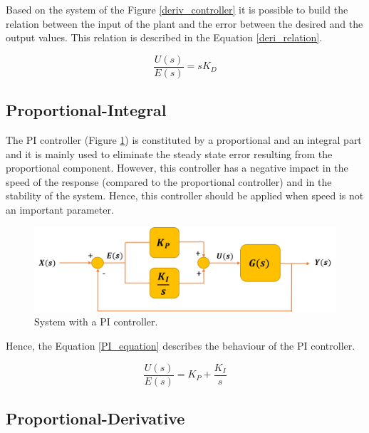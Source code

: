 Based on the system of the Figure \ref{deriv_controller} it is possible to build the relation between the input of the plant and the error between the desired and the output values. This relation is described in the Equation \ref{deri_relation}.

\begin{equation}\label{deri_relation}
\frac{U(s)}{E(s)}= sK_D
\end{equation}

\subsection*{Proportional-Integral}

The PI controller (Figure \ref{PI_controller}) is constituted by a proportional and an integral part and it is mainly used to eliminate the steady state error resulting from the proportional component. However, this controller has a negative impact in the speed of the response (compared to the proportional controller) and in the stability of the system. Hence, this controller should be applied when speed is not an important parameter. %

\begin{figure}[H]
	\centering
	\includegraphics[scale=0.6]{figures/PI_controller.png}
	\caption{System with a PI controller.}
	\label{PI_controller}
\end{figure}

Hence, the Equation \ref{PI_equation} describes the behaviour of the PI controller.

\begin{equation}\label{PI_equation}
\frac{U(s)}{E(s)}= K_P + \frac{K_I}{s}
\end{equation}

\subsection*{Proportional-Derivative}


